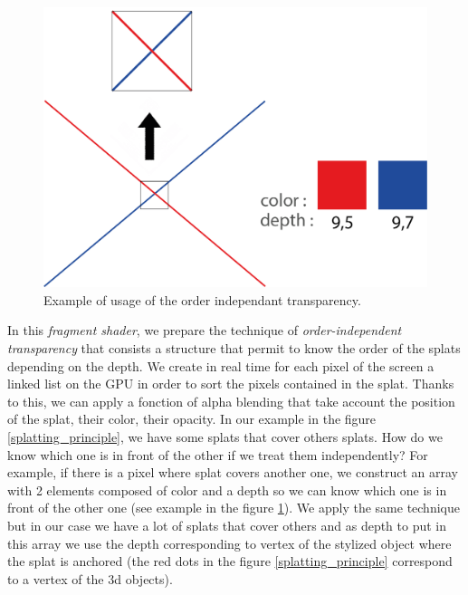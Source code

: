 \begin{figure}[H]
    \begin{center}
    \includegraphics[scale=0.3]{images/splatting/order_independant_transparency.png}
    \end{center}
    \caption{Example of usage of the order independant transparency.}
    \label{order}
\end{figure}



In this \textit{fragment shader}, we prepare the technique of \textit{order-independent transparency} \cite{Munstermann} that consists a structure that permit to know the order of the splats depending on the depth. We create in real time for each pixel of the screen a linked list on the GPU in order to sort the pixels contained in the splat. Thanks to this, we can apply a fonction of alpha blending that take account the position of the splat, their color, their opacity. In our example in the figure \ref{splatting_principle}, we have some splats that cover others splats. How do we know which one is in front of the other if we treat them independently? For example, if there is a pixel where splat covers another one, we construct an array with 2 elements composed of color and a depth so we can know which one is in front of the other one (see example in the figure \ref{order}). We apply the same technique but in our case we have a lot of splats that cover others and as depth to put in this array we use the depth corresponding to vertex of the stylized object where the splat is anchored (the red dots in the figure \ref{splatting_principle} correspond to a vertex of the 3d objects). \newline

